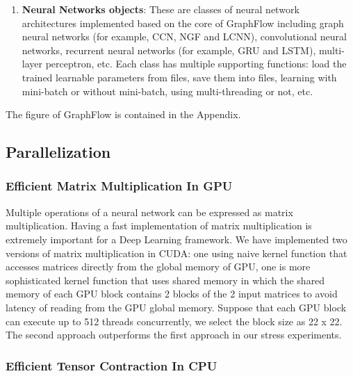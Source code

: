 \documentclass[a4paper]{article}
\begin{document}
\begin{enumerate}
	\item \textbf{Neural Networks objects}: These are classes of neural network architectures implemented based on the core of GraphFlow including graph neural networks (for example, CCN, NGF and LCNN), convolutional neural networks, recurrent neural networks (for example, GRU and LSTM), multi-layer perceptron, etc. Each class has multiple supporting functions: load the trained learnable parameters from files, save them into files, learning with mini-batch or without mini-batch, using multi-threading or not, etc.
\end{enumerate}
The figure of GraphFlow is contained in the Appendix.

\subsection{Parallelization}

\subsubsection{Efficient Matrix Multiplication In GPU}

Multiple operations of a neural network can be expressed as matrix multiplication. Having a fast implementation of matrix multiplication is extremely important for a Deep Learning framework. We have implemented two versions of matrix multiplication in CUDA: one using naive kernel function that accesses matrices directly from the global memory of GPU, one is more sophisticated kernel function that uses shared memory in which the shared memory of each GPU block contains 2 blocks of the 2 input matrices to avoid latency of reading from the GPU global memory. Suppose that each GPU block can execute up to 512 threads concurrently, we select the block size as 22 x 22. The second approach outperforms the first approach in our stress experiments.

\subsubsection{Efficient Tensor Contraction In CPU}
\end{document}
